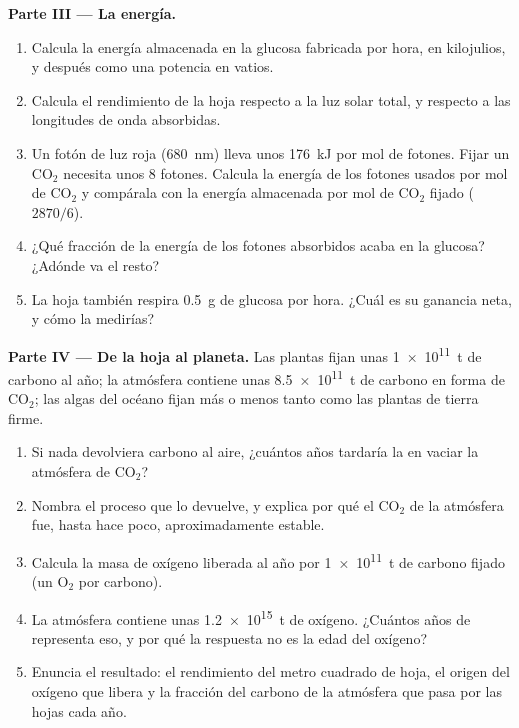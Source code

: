 \begin{problem}
\medskip
\noindent\textbf{Parte III --- La energía.}
\begin{enumerate}[resume]
  \item Calcula la energía almacenada en la glucosa fabricada por hora,
        en kilojulios, y después como una potencia en vatios.
  \item Calcula el rendimiento de la hoja respecto a la luz solar
        total, y respecto a las longitudes de onda absorbidas.
  \item Un fotón de luz roja (\qty{680}{nm}) lleva unos \qty{176}{kJ}
        por mol de fotones. Fijar un $\mathrm{CO_2}$ necesita unos 8
        fotones. Calcula la energía de los fotones usados por mol de
        $\mathrm{CO_2}$ y compárala con la energía almacenada por mol
        de $\mathrm{CO_2}$ fijado ($2870/6$).
  \item ¿Qué fracción de la energía de los fotones absorbidos acaba en
        la glucosa? ¿Adónde va el resto?
  \item La hoja también respira \qty{0.5}{g} de glucosa por hora.
        ¿Cuál es su ganancia neta, y cómo la medirías?
\end{enumerate}

\medskip
\noindent\textbf{Parte IV --- De la hoja al planeta.}
Las plantas fijan unas \qty{1e11}{t} de carbono al año; la atmósfera
contiene unas \qty{8.5e11}{t} de carbono en forma de $\mathrm{CO_2}$;
las algas del océano fijan más o menos tanto como las plantas de tierra
firme.
\begin{enumerate}[resume]
  \item Si nada devolviera carbono al aire, ¿cuántos años tardaría la
         en vaciar la atmósfera de $\mathrm{CO_2}$?
  \item Nombra el proceso que lo devuelve, y explica por qué el
        $\mathrm{CO_2}$ de la atmósfera fue, hasta hace poco,
        aproximadamente estable.
  \item Calcula la masa de oxígeno liberada al año por \qty{1e11}{t} de
        carbono fijado (un $\mathrm{O_2}$ por carbono).
  \item La atmósfera contiene unas \qty{1.2e15}{t} de oxígeno.
        ¿Cuántos años de  representa eso, y por qué la
        respuesta no es la edad del oxígeno?
  \item Enuncia el resultado: el rendimiento del metro cuadrado de
        hoja, el origen del oxígeno que libera y la fracción del
        carbono de la atmósfera que pasa por las hojas cada año.
\end{enumerate}
\end{problem}
